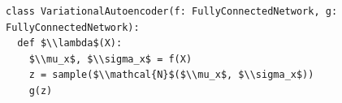 \documentclass[border=10pt]{standalone}
\begin{document}
\begin{lstlisting}
class VariationalAutoencoder(f: FullyConnectedNetwork, g: FullyConnectedNetwork):
  def $\\lambda$(X):
    $\\mu_x$, $\\sigma_x$ = f(X)
    z = sample($\\mathcal{N}$($\\mu_x$, $\\sigma_x$))
    g(z)
\end{lstlisting}
\end{document}
